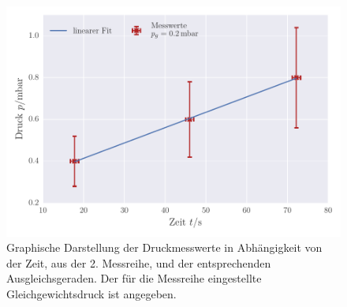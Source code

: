 \begin{figure}[!h]
 \centering
 \includegraphics[scale=0.9]{../Grafiken/Leckrate_Drehschieber_1.pdf}
 \caption{Graphische Darstellung der Druckmesswerte in Abhängigkeit von der Zeit, aus der 2. Messreihe, und der
 	entsprechenden Ausgleichsgeraden. Der für die Messreihe eingestellte Gleichgewichtsdruck ist angegeben.\label{fig:leckrate_drehschieber_1}}
 \end{figure} 